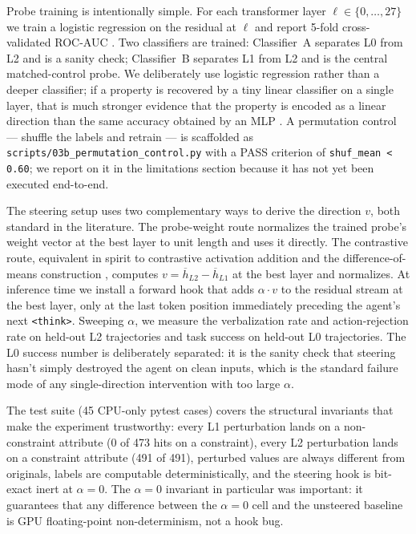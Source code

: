 \documentclass[11pt]{article}
\begin{document}
Probe training is intentionally simple. For each transformer layer
$\ell \in \{0, \dots, 27\}$ we train a logistic regression on the residual
at $\ell$ and report 5-fold cross-validated ROC-AUC \citep{alain2016probes}.
Two classifiers are trained: Classifier~A separates L0 from L2 and is a
sanity check; Classifier~B separates L1 from L2 and is the central
matched-control probe. We deliberately use logistic regression rather than
a deeper classifier; if a property is recovered by a tiny linear classifier
on a single layer, that is much stronger evidence that the property is
encoded as a linear direction than the same accuracy obtained by an MLP
\citep{belinkov2022probing}. A permutation control --- shuffle the labels
and retrain --- is scaffolded as \texttt{scripts/03b\_permutation\_control.py}
with a PASS criterion of \texttt{shuf\_mean < 0.60}; we report on it in the
limitations section because it has not yet been executed end-to-end.

The steering setup uses two complementary ways to derive the direction $v$,
both standard in the literature. The probe-weight route normalizes the
trained probe's weight vector at the best layer to unit length and uses it
directly. The contrastive route, equivalent in spirit to
contrastive activation addition and the difference-of-means construction
\citep{turner2023actadd, panickssery2024caa}, computes $v = \overline{h}_{L2}
- \overline{h}_{L1}$ at the best layer and normalizes. At inference time we
install a forward hook that adds $\alpha \cdot v$ to the residual stream at
the best layer, only at the last token position immediately preceding the
agent's next \texttt{<think>}. Sweeping $\alpha$, we measure the
verbalization rate and action-rejection rate on held-out L2 trajectories and
task success on held-out L0 trajectories. The L0 success number is
deliberately separated: it is the sanity check that steering hasn't simply
destroyed the agent on clean inputs, which is the standard failure mode of
any single-direction intervention with too large $\alpha$.

The test suite (45 CPU-only pytest cases) covers the structural invariants
that make the experiment trustworthy: every L1 perturbation lands on a
non-constraint attribute (0 of 473 hits on a constraint), every L2
perturbation lands on a constraint attribute (491 of 491), perturbed values
are always different from originals, labels are computable deterministically,
and the steering hook is bit-exact inert at $\alpha = 0$. The
$\alpha = 0$ invariant in particular was important: it guarantees that any
difference between the $\alpha = 0$ cell and the unsteered baseline is GPU
floating-point non-determinism, not a hook bug.
\end{document}
